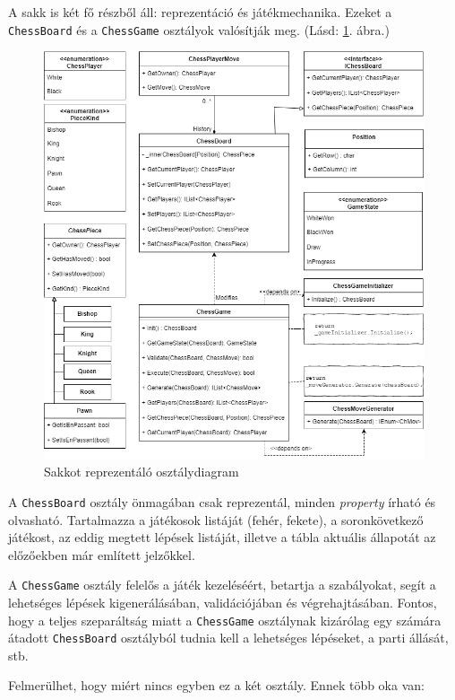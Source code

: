\documentclass[twoside, a4paper, 12pt]{article}
\begin{document}
A sakk is két fő részből áll: reprezentáció és játékmechanika. Ezeket a \texttt{ChessBoard} és a \texttt{ChessGame} osztályok valósítják meg. (Lásd: \ref{fig:chessClassDiagram}. ábra.)

\begin{figure}[htbp]
	\centering
	\includegraphics[width=\textwidth]{img/chessClassDiagram.png}
	\caption{Sakkot reprezentáló osztálydiagram}
	\label{fig:chessClassDiagram}
\end{figure}

A \texttt{ChessBoard} osztály önmagában csak reprezentál, minden \textit{property} írható és olvasható. Tartalmazza a játékosok listáját (fehér, fekete), a soronkövetkező játékost, az eddig megtett lépések listáját, illetve a tábla aktuális állapotát az előzőekben már említett jelzőkkel.

A \texttt{ChessGame} osztály felelős a játék kezeléséért, betartja a szabályokat, segít a lehetséges lépések kigenerálásában, validációjában és végrehajtásában. Fontos, hogy a teljes szeparáltság miatt a \texttt{ChessGame} osztálynak kizárólag egy számára átadott \texttt{ChessBoard} osztályból tudnia kell a lehetséges lépéseket, a parti állását, stb.

Felmerülhet, hogy miért nincs egyben ez a két osztály. Ennek több oka van:
\end{document}
